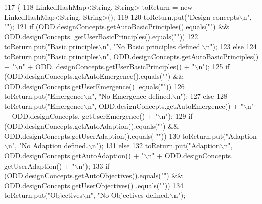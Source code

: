 \begin{DoxyCode}
117                                                                    \{
118         LinkedHashMap<String, String> toReturn = \textcolor{keyword}{new} LinkedHashMap<String, String>();
119 
120         toReturn.put(\textcolor{stringliteral}{"Design concepts\(\backslash\)n"}, \textcolor{stringliteral}{""});
121         \textcolor{keywordflow}{if} (ODD.designConcepts.getAutoBasicPrinciples().equals(\textcolor{stringliteral}{""}) && ODD.designConcepts.
      getUserBasicPrinciples().equals(\textcolor{stringliteral}{""}))
122             toReturn.put(\textcolor{stringliteral}{"Basic principles\(\backslash\)n"}, \textcolor{stringliteral}{"No Basic principles defined.\(\backslash\)n"});
123         \textcolor{keywordflow}{else}
124             toReturn.put(\textcolor{stringliteral}{"Basic principles\(\backslash\)n"}, ODD.designConcepts.getAutoBasicPrinciples() + \textcolor{stringliteral}{"\(\backslash\)n"} + ODD.
      designConcepts.getUserBasicPrinciples() + \textcolor{stringliteral}{"\(\backslash\)n"});
125         \textcolor{keywordflow}{if} (ODD.designConcepts.getAutoEmergence().equals(\textcolor{stringliteral}{""}) && ODD.designConcepts.getUserEmergence()
      .equals(\textcolor{stringliteral}{""}))
126             toReturn.put(\textcolor{stringliteral}{"Emergence\(\backslash\)n"}, \textcolor{stringliteral}{"No Emergence defined.\(\backslash\)n"});
127         \textcolor{keywordflow}{else}
128             toReturn.put(\textcolor{stringliteral}{"Emergence\(\backslash\)n"}, ODD.designConcepts.getAutoEmergence() + \textcolor{stringliteral}{"\(\backslash\)n"} + ODD.designConcepts.
      getUserEmergence() + \textcolor{stringliteral}{"\(\backslash\)n"});
129         \textcolor{keywordflow}{if} (ODD.designConcepts.getAutoAdaption().equals(\textcolor{stringliteral}{""}) && ODD.designConcepts.getUserAdaption().equals(\textcolor{stringliteral}{
      ""}))
130             toReturn.put(\textcolor{stringliteral}{"Adaption\(\backslash\)n"}, \textcolor{stringliteral}{"No Adaption defined.\(\backslash\)n"});
131         \textcolor{keywordflow}{else}
132             toReturn.put(\textcolor{stringliteral}{"Adaption\(\backslash\)n"}, ODD.designConcepts.getAutoAdaption() + \textcolor{stringliteral}{"\(\backslash\)n"} + ODD.designConcepts.
      getUserAdaption() + \textcolor{stringliteral}{"\(\backslash\)n"});
133         \textcolor{keywordflow}{if} (ODD.designConcepts.getAutoObjectives().equals(\textcolor{stringliteral}{""}) && ODD.designConcepts.getUserObjectives()
      .equals(\textcolor{stringliteral}{""}))
134             toReturn.put(\textcolor{stringliteral}{"Objectives\(\backslash\)n"}, \textcolor{stringliteral}{"No Objectives defined.\(\backslash\)n"});

\end{DoxyCode}
